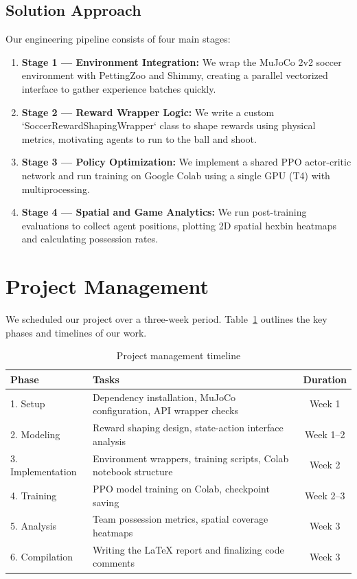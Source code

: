 \subsection{Solution Approach}
\label{sec:intro_sol}

Our engineering pipeline consists of four main stages:

\begin{enumerate}
    \item \textbf{Stage 1 — Environment Integration:} We wrap the MuJoCo 2v2 soccer environment with PettingZoo and Shimmy, creating a parallel vectorized interface to gather experience batches quickly.
    \item \textbf{Stage 2 — Reward Wrapper Logic:} We write a custom `SoccerRewardShapingWrapper` class to shape rewards using physical metrics, motivating agents to run to the ball and shoot.
    \item \textbf{Stage 3 — Policy Optimization:} We implement a shared PPO actor-critic network and run training on Google Colab using a single GPU (T4) with multiprocessing.
    \item \textbf{Stage 4 — Spatial and Game Analytics:} We run post-training evaluations to collect agent positions, plotting 2D spatial hexbin heatmaps and calculating possession rates.
\end{enumerate}

\section{Project Management}
\label{sec:proj_mgmt}

We scheduled our project over a three-week period. Table~\ref{tab:gantt} outlines the key phases and timelines of our work.

\begin{table}[!ht]
    \centering
    \caption{Project management timeline}
    \label{tab:gantt}
    \begin{tabular}{llc}
        \toprule
        \textbf{Phase} & \textbf{Tasks} & \textbf{Duration} \\
        \midrule
        1. Setup         & Dependency installation, MuJoCo configuration, API wrapper checks & Week 1 \\
        2. Modeling      & Reward shaping design, state-action interface analysis & Week 1--2 \\
        3. Implementation & Environment wrappers, training scripts, Colab notebook structure & Week 2 \\
        4. Training      & PPO model training on Colab, checkpoint saving & Week 2--3 \\
        5. Analysis      & Team possession metrics, spatial coverage heatmaps & Week 3 \\
        6. Compilation   & Writing the LaTeX report and finalizing code comments & Week 3 \\
        \bottomrule
    \end{tabular}
\end{table}

